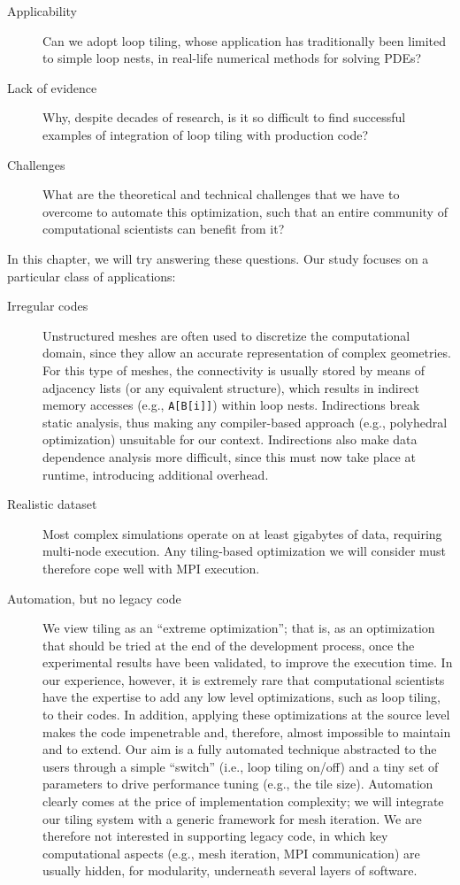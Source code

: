 \begin{description}
\item[Applicability] Can we adopt loop tiling, whose application has traditionally been limited to simple loop nests, in real-life numerical methods for solving PDEs?
\item[Lack of evidence] Why, despite decades of research, is it so difficult to find successful examples of integration of loop tiling with production code? 
\item[Challenges] What are the theoretical and technical challenges that we have to overcome to automate this optimization, such that an entire community of computational scientists can benefit from it?
\end{description}

In this chapter, we will try answering these questions. Our study focuses on a particular class of applications:
\begin{description}
\item[Irregular codes] Unstructured meshes are often used to discretize the computational domain, since they allow an accurate representation of complex geometries. For this type of meshes, the connectivity is usually stored by means of adjacency lists (or any equivalent structure), which results in indirect memory accesses (e.g., \texttt{A[B[i]]}) within loop nests. Indirections break static analysis, thus making any compiler-based approach (e.g., polyhedral optimization) unsuitable for our context. Indirections also make data dependence analysis more difficult, since this must now take place at runtime, introducing additional overhead.
\item[Realistic dataset] Most complex simulations operate on at least gigabytes of data, requiring multi-node execution. Any tiling-based optimization we will consider must therefore cope well with MPI execution.
\item[Automation, but no legacy code] We view tiling as an ``extreme optimization''; that is, as an optimization that should be tried at the end of the development process, once the experimental results have been validated, to improve the execution time. In our experience, however, it is extremely rare that computational scientists have the expertise to add any low level optimizations, such as loop tiling, to their codes. In addition, applying these optimizations at the source level makes the code impenetrable and, therefore, almost impossible to maintain and to extend. Our aim is a fully automated technique abstracted to the users through a simple ``switch'' (i.e., loop tiling on/off) and a tiny set of parameters to drive performance tuning (e.g., the tile size). Automation clearly comes at the price of implementation complexity; we will integrate our tiling system with a generic framework for mesh iteration. We are therefore not interested in supporting legacy code, in which key computational aspects (e.g., mesh iteration, MPI communication) are usually hidden, for modularity, underneath several layers of software.
\end{description}

